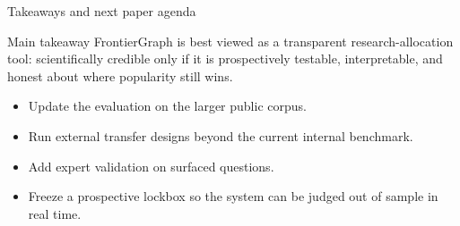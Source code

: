 \documentclass[aspectratio=169,11pt]{beamer}
\begin{document}
\begin{frame}[label=main-next]{Takeaways and next paper agenda}
\small
\begin{block}{Main takeaway}
FrontierGraph is best viewed as a transparent research-allocation tool: scientifically credible only if it is prospectively testable, interpretable, and honest about where popularity still wins.
\end{block}

\vspace{0.45em}
\begin{itemize}
  \item Update the evaluation on the larger public corpus.
  \item Run external transfer designs beyond the current internal benchmark.
  \item Add expert validation on surfaced questions.
  \item Freeze a prospective lockbox so the system can be judged out of sample in real time.
\end{itemize}
\end{frame}

\appendix
\end{document}
